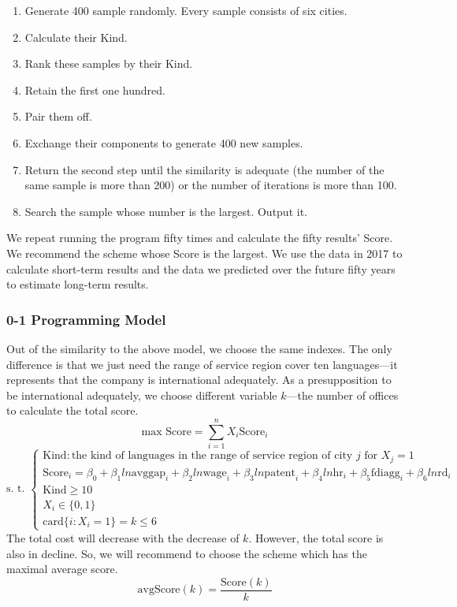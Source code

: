 \documentclass{mcmthesis}
\begin{document}
\begin{enumerate}[1]
\item Generate 400 sample randomly. Every sample consists of six cities. 
\item Calculate their Kind. 
\item Rank these samples by their Kind. 
\item Retain the first one hundred. 
\item Pair them off. 
\item Exchange their components to generate 400 new samples. 
\item Return the second step until the similarity is adequate (the number of the same sample is more than 200) or the number of iterations is more than 100. 
\item Search the sample whose number is the largest. Output it. 
\end{enumerate}
We repeat running the program fifty times and calculate the fifty results' Score. We recommend the scheme whose Score is the largest. We use the data in 2017 to calculate short-term results and the data we predicted over the future fifty years to estimate long-term results.

\subsubsection{0-1 Programming Model}
Out of the similarity to the above model, we choose the same indexes. The only difference is that we just need the range of service region cover ten languages---it represents  that the company is international adequately. As a presupposition to be international adequately, we choose different variable \(k\)---the number of offices to calculate the total score. 
\[\textrm{max Score}=\sum\limits_{i=1}^{n}X_i\textrm{Score}_i\]
\[\textrm{s. t. }\left\{
\begin{array}{l}
\textrm{Kind}: \textrm{the kind of languages in the range of service region of city }j\textrm{ for }X_j=1\\
\textrm{Score}_i=\beta_0+\beta_1ln\textrm{avggap}_i+\beta_2ln\textrm{wage}_i+\beta_3ln\textrm{patent}_i+\beta_4ln\textrm{hr}_i+\beta_5\textrm{fdiagg}_i+\beta_6ln\textrm{rd}_i\\
\textrm{Kind}\geqslant 10\\
X_i\in\{0, 1\}\\
\textrm{card}\{i: X_i=1\}=k\leqslant6
\end{array}\right. \]
The total cost will decrease with the decrease of \(k\). However, the total score is also in decline. So, we will recommend to choose the scheme which has the maximal average score. 
\[\textrm{avgScore}(k)=\frac{\textrm{Score}(k)}{k}\]
\end{document}
